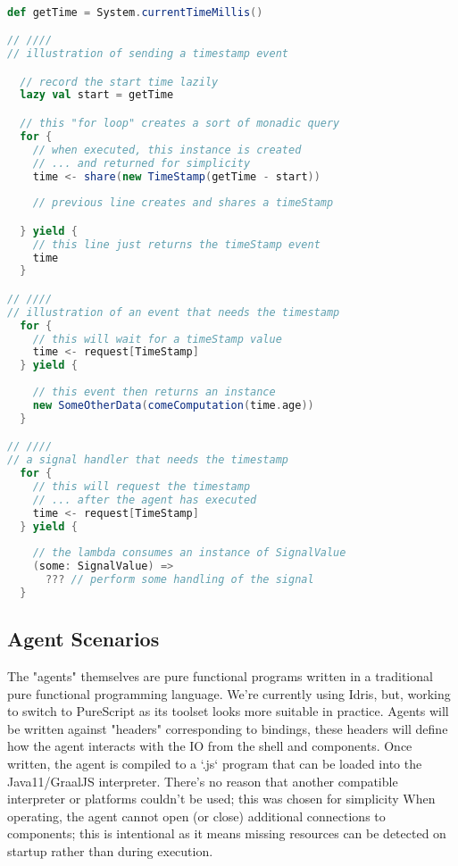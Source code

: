 \begin{lstlisting}[caption={Scala for-yield to interact with the agent}, label={lst:depa},basicstyle=\small,language=Scala]

def getTime = System.currentTimeMillis()

// ////
// illustration of sending a timestamp event

  // record the start time lazily
  lazy val start = getTime

  // this "for loop" creates a sort of monadic query
  for {
    // when executed, this instance is created
    // ... and returned for simplicity
    time <- share(new TimeStamp(getTime - start))
    
    // previous line creates and shares a timeStamp

  } yield {
    // this line just returns the timeStamp event
    time
  }

// ////
// illustration of an event that needs the timestamp
  for {
    // this will wait for a timeStamp value
    time <- request[TimeStamp]
  } yield {
    
    // this event then returns an instance
    new SomeOtherData(comeComputation(time.age))
  }

// ////
// a signal handler that needs the timestamp
  for {
    // this will request the timestamp
    // ... after the agent has executed
    time <- request[TimeStamp]
  } yield {
    
    // the lambda consumes an instance of SignalValue
    (some: SignalValue) =>
      ??? // perform some handling of the signal
  }

\end{lstlisting}



\subsection{Agent Scenarios}

The "agents" themselves are pure functional programs written in a traditional pure functional programming language.
    We're currently using Idris, but, working to switch to PureScript as its toolset looks more suitable in practice.
Agents will be written against "headers" corresponding to bindings, these headers will define how the agent interacts with the IO from the shell and components.
Once written, the agent is compiled to a `.js` program that can be loaded into the Java11/GraalJS interpreter.
    There's no reason that another compatible interpreter or platforms couldn't be used; this was chosen for simplicity 
When operating, the agent cannot open (or close) additional connections to components; this is intentional as it means missing resources can be detected on startup rather than during execution.


